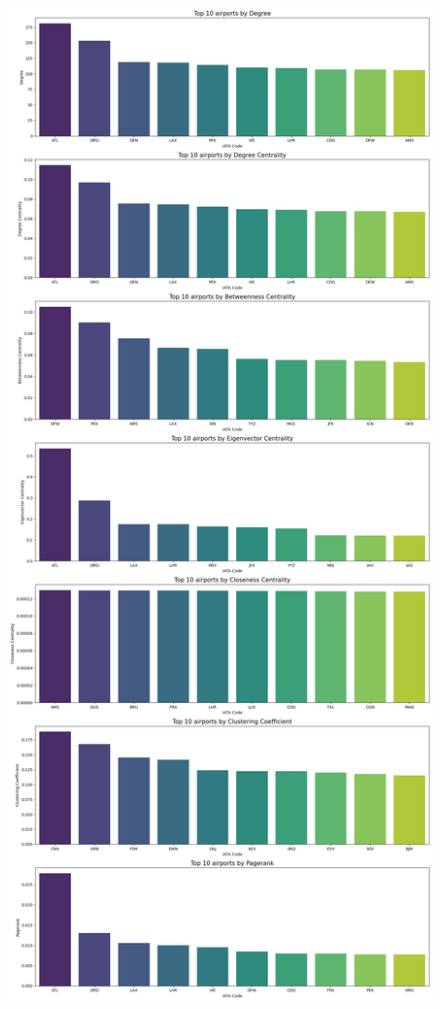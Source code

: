 \documentclass[12pt]{article}
\begin{document}
    \begin{figure}[H]
        \centering
        \includegraphics[width=0.8\linewidth]{img/pagerank2.png}
    \end{figure}
\end{document}
